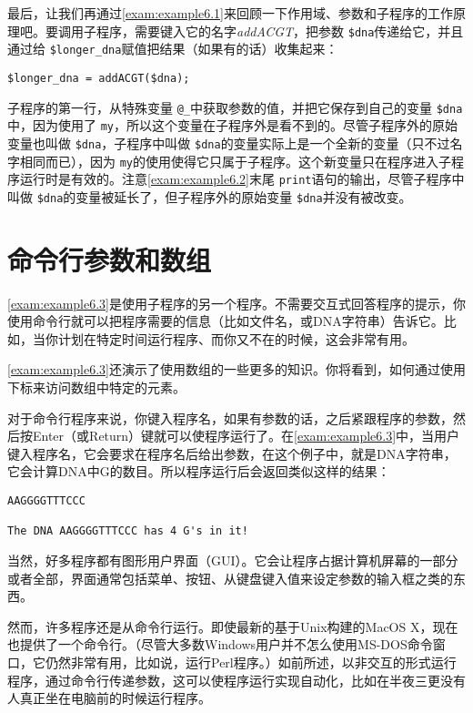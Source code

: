 最后，让我们再通过\autoref{exam:example6.1}来回顾一下作用域、参数和子程序的工作原理吧。要调用子程序，需要键入它的名字\textit{addACGT}，把参数 \verb|$dna|传递给它，并且通过给 \verb|$longer_dna|赋值把结果（如果有的话）收集起来：

\begin{lstlisting}
$longer_dna = addACGT($dna); 
\end{lstlisting}

子程序的第一行，从特殊变量 \verb|@_|中获取参数的值，并把它保存到自己的变量 \verb|$dna|中，因为使用了 \verb|my|，所以这个变量在子程序外是看不到的。尽管子程序外的原始变量也叫做 \verb|$dna|，子程序中叫做 \verb|$dna|的变量实际上是一个全新的变量（只不过名字相同而已），因为 \verb|my|的使用使得它只属于子程序。这个新变量只在程序进入子程序运行时是有效的。注意\autoref{exam:example6.2}末尾 \verb|print|语句的输出，尽管子程序中叫做 \verb|$dna|的变量被延长了，但子程序外的原始变量 \verb|$dna|并没有被改变。

\section{命令行参数和数组}
\autoref{exam:example6.3}是使用子程序的另一个程序。不需要交互式回答程序的提示，你使用命令行就可以把程序需要的信息（比如文件名，或DNA字符串）告诉它。比如，当你计划在特定时间运行程序、而你又不在的时候，这会非常有用。

\autoref{exam:example6.3}还演示了使用数组的一些更多的知识。你将看到，如何通过使用下标来访问数组中特定的元素。

对于命令行程序来说，你键入程序名，如果有参数的话，之后紧跟程序的参数，然后按Enter（或Return）键就可以使程序运行了。在\autoref{exam:example6.3}中，当用户键入程序名，它会要求在程序名后给出参数，在这个例子中，就是DNA字符串，它会计算DNA中G的数目。所以程序运行后会返回类似这样的结果：

\begin{lstlisting}
AAGGGGTTTCCC

The DNA AAGGGGTTTCCC has 4 G's in it!
\end{lstlisting}

当然，好多程序都有图形用户界面（GUI）。它会让程序占据计算机屏幕的一部分或者全部，界面通常包括菜单、按钮、从键盘键入值来设定参数的输入框之类的东西。

然而，许多程序还是从命令行运行。即使最新的基于Unix构建的MacOS
X，现在也提供了一个命令行。（尽管大多数Windows用户并不怎么使用MS-DOS命令窗口，它仍然非常有用，比如说，运行Perl程序。）如前所述，以非交互的形式运行程序，通过命令行传递参数，这可以使程序运行实现自动化，比如在半夜三更没有人真正坐在电脑前的时候运行程序。

